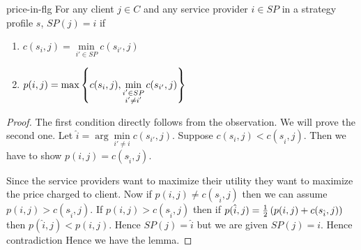\begin{lemma}{}{price-in-flg}
	For any client $j\in C$ and any service provider $i\in SP$ in a strategy profile $s$,  $SP(j)=i$ if\begin{enumerate}[label=(\roman*)]
		\item $c(s_i,j)=\min\limits_{i'\in SP}c(s_{i'},j)$
		\item $p(i,j)=\max\left\{c(s_i,j),\min\limits_{\substack{i'\in SP\\ i'\neq i'}}c(s_{i'},j)\right\}$
			\end{enumerate}
\end{lemma}
\begin{proof}
	The first condition directly follows from the observation.  We will prove the second one.   Let $\hat{i}=\arg\min\limits_{i'\neq i}c(s_{i'},j)$. Suppose $c(s_i,j)<c(s_{\hat{i}},j)$. Then we have to show $p(i,j)=c(s_{\hat{i}},j)$.  
	
	Since the service providers want to maximize their utility they want to maximize the price charged to client. Now if $p(i,j)\neq c(s_{\hat{i}},j)$ then we can assume $p(i,j)>c(s_{\hat{i}},j)$. If $p(i,j)>c(s_{\hat{i}},j)$ then if $p(\hat{i},j)=\frac12\left(p(i,j)+c(s_{\hat{i}},j)\right)$ then $p(\hat{i},j)<p(i,j)$. Hence $SP(j)=\hat{i}$ but we are given $SP(j)=i$. Hence contradiction \ctr Hence we have the lemma.
\end{proof}
